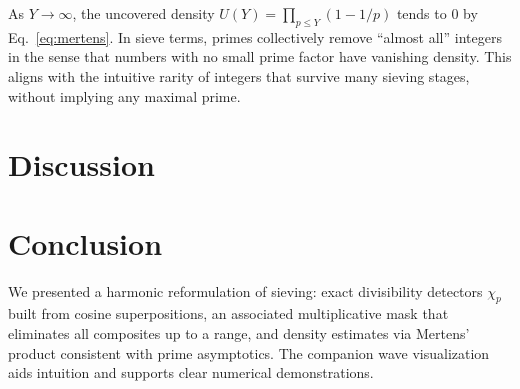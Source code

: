 \documentclass[reprint,amsmath,amssymb,aps,pra]{revtex4-2}
\begin{document}
As $Y\to\infty$, the uncovered density $U(Y)=\prod_{p\le Y}(1-1/p)$ tends to $0$ by Eq.~\eqref{eq:mertens}. In sieve terms, primes collectively remove “almost all” integers in the sense that numbers with no small prime factor have vanishing density. This aligns with the intuitive rarity of integers that survive many sieving stages, without implying any maximal prime.

\section{Discussion}

\section{Conclusion}

We presented a harmonic reformulation of sieving: exact divisibility detectors $\chi_p$ built from cosine superpositions, an associated multiplicative mask that eliminates all composites up to a range, and density estimates via Mertens’ product consistent with prime asymptotics. The companion wave visualization aids intuition and supports clear numerical demonstrations.

\end{document}
